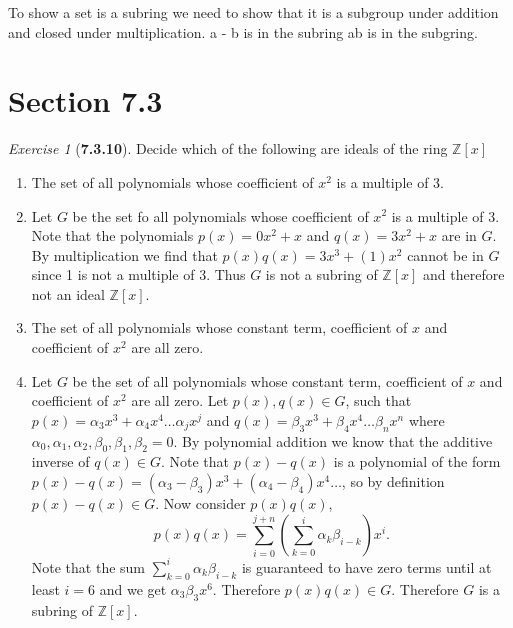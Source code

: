 \documentclass[12pt]{amsart}
\makeatletter
\theoremstyle{remark}
\newtheorem*{exercise}{Exercise}%
\def\ZZ{\ensuremath{\mathbb Z}}
\renewenvironment{proof}[1][\proofname]{\par\doublespacing
  \pushQED{\qed}%
  \normalfont \topsep6\p@\@plus6\p@\relax
  \list{}{%
    \settowidth{\leftmargin}{\itshape\proofname:\hskip\labelsep}%
    \setlength{\labelwidth}{0pt}%
    \setlength{\itemindent}{-\leftmargin}%
  }%
  \item[\hskip\labelsep\itshape#1\@addpunct{:}]\ignorespaces
}{%
  \popQED\endlist\@endpefalse
  \singlespacing
}
\theoremstyle{mycomment}
\makeatother
\begin{document}
\thispagestyle{fancy}
\author{Coordinator: Coordinator's Name}







To show a set is a subring we need to show that it is a subgroup under addition and closed under multiplication. 
a - b is in the subring
ab is in the subgring. 


\section*{\textbf{Section 7.3}}

\begin{exercise}[\textbf{7.3.10}] Decide which of the following are ideals of the ring $\ZZ[x]$
  \begin{enumerate}
    \item[b.] The set of all polynomials whose coefficient of $x^2$ is a multiple of 3.
    \begin{proof} Let $G$ be the set fo all polynomials whose coefficient of $x^2$ is a multiple of 3. Note that 
      the polynomials $p(x) = 0x^2 + x$ and $q(x) = 3x^2 + x$ are in $G$. By multiplication we find that $p(x)q(x) = 3x^3 + (1)x^2$ cannot
      be in $G$ since 1 is not a multiple of 3. Thus $G$ is not a subring of $\ZZ[x]$ and therefore not an ideal $\ZZ[x]$.
    \end{proof}
    \vspace{.15in}

    \item[c.] The set of all polynomials whose constant term, coefficient of $x$ and coefficient of $x^2$ are all zero. 
    \begin{proof} Let $G$ be the set of all polynomials whose constant term, coefficient of $x$ and coefficient of $x^2$ are all zero.
      Let $p(x), q(x) \in G$, such that $p(x) = \alpha_3 x^3 + \alpha_4 x^4 \dots \alpha_{j}x^{j}$ and $q(x) = \beta_3 x^3 + \beta_4 x^4 \dots \beta_{n}x^{n}$ 
      where $\alpha_0, \alpha_1, \alpha_2, \beta_0, \beta_1, \beta_2 = 0$. By polynomial addition we know that the additive inverse of $q(x) \in G$. Note that
      $p(x) - q(x)$ is a polynomial of the form $p(x) - q(x) = (\alpha_3 - \beta_3)x^3 + (\alpha_4 - \beta_4)x^4 \dots $, so by definition $p(x) - q(x) \in G$. 
      Now consider $p(x)q(x)$, 
      \begin{equation*}
        p(x)q(x) = \sum_{i = 0}^{j + n} \left(\sum_{k = 0}^i \alpha_k \beta_{i - k}\right) x^i.
      \end{equation*}
      Note that the sum $\sum_{k = 0}^i \alpha_k \beta_{i - k}$ is guaranteed to have zero terms until at least $i = 6$ and we get $\alpha_3\beta_3 x^6$. Therefore
      $p(x)q(x) \in G$. Therefore $G$ is a subring of $\ZZ[x]$. 



\end{proof}
\end{enumerate}
\end{exercise}
\end{document}
